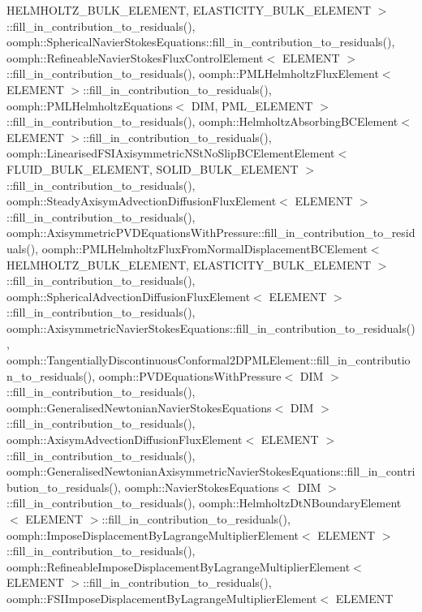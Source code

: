 H\+E\+L\+M\+H\+O\+L\+T\+Z\+\_\+\+B\+U\+L\+K\+\_\+\+E\+L\+E\+M\+E\+N\+T, E\+L\+A\+S\+T\+I\+C\+I\+T\+Y\+\_\+\+B\+U\+L\+K\+\_\+\+E\+L\+E\+M\+E\+N\+T $>$\+::fill\+\_\+in\+\_\+contribution\+\_\+to\+\_\+residuals(), oomph\+::\+Spherical\+Navier\+Stokes\+Equations\+::fill\+\_\+in\+\_\+contribution\+\_\+to\+\_\+residuals(), oomph\+::\+Refineable\+Navier\+Stokes\+Flux\+Control\+Element$<$ E\+L\+E\+M\+E\+N\+T $>$\+::fill\+\_\+in\+\_\+contribution\+\_\+to\+\_\+residuals(), oomph\+::\+P\+M\+L\+Helmholtz\+Flux\+Element$<$ E\+L\+E\+M\+E\+N\+T $>$\+::fill\+\_\+in\+\_\+contribution\+\_\+to\+\_\+residuals(), oomph\+::\+P\+M\+L\+Helmholtz\+Equations$<$ D\+I\+M, P\+M\+L\+\_\+\+E\+L\+E\+M\+E\+N\+T $>$\+::fill\+\_\+in\+\_\+contribution\+\_\+to\+\_\+residuals(), oomph\+::\+Helmholtz\+Absorbing\+B\+C\+Element$<$ E\+L\+E\+M\+E\+N\+T $>$\+::fill\+\_\+in\+\_\+contribution\+\_\+to\+\_\+residuals(), oomph\+::\+Linearised\+F\+S\+I\+Axisymmetric\+N\+St\+No\+Slip\+B\+C\+Element\+Element$<$ F\+L\+U\+I\+D\+\_\+\+B\+U\+L\+K\+\_\+\+E\+L\+E\+M\+E\+N\+T, S\+O\+L\+I\+D\+\_\+\+B\+U\+L\+K\+\_\+\+E\+L\+E\+M\+E\+N\+T $>$\+::fill\+\_\+in\+\_\+contribution\+\_\+to\+\_\+residuals(), oomph\+::\+Steady\+Axisym\+Advection\+Diffusion\+Flux\+Element$<$ E\+L\+E\+M\+E\+N\+T $>$\+::fill\+\_\+in\+\_\+contribution\+\_\+to\+\_\+residuals(), oomph\+::\+Axisymmetric\+P\+V\+D\+Equations\+With\+Pressure\+::fill\+\_\+in\+\_\+contribution\+\_\+to\+\_\+residuals(), oomph\+::\+P\+M\+L\+Helmholtz\+Flux\+From\+Normal\+Displacement\+B\+C\+Element$<$ H\+E\+L\+M\+H\+O\+L\+T\+Z\+\_\+\+B\+U\+L\+K\+\_\+\+E\+L\+E\+M\+E\+N\+T, E\+L\+A\+S\+T\+I\+C\+I\+T\+Y\+\_\+\+B\+U\+L\+K\+\_\+\+E\+L\+E\+M\+E\+N\+T $>$\+::fill\+\_\+in\+\_\+contribution\+\_\+to\+\_\+residuals(), oomph\+::\+Spherical\+Advection\+Diffusion\+Flux\+Element$<$ E\+L\+E\+M\+E\+N\+T $>$\+::fill\+\_\+in\+\_\+contribution\+\_\+to\+\_\+residuals(), oomph\+::\+Axisymmetric\+Navier\+Stokes\+Equations\+::fill\+\_\+in\+\_\+contribution\+\_\+to\+\_\+residuals(), oomph\+::\+Tangentially\+Discontinuous\+Conformal2\+D\+P\+M\+L\+Element\+::fill\+\_\+in\+\_\+contribution\+\_\+to\+\_\+residuals(), oomph\+::\+P\+V\+D\+Equations\+With\+Pressure$<$ D\+I\+M $>$\+::fill\+\_\+in\+\_\+contribution\+\_\+to\+\_\+residuals(), oomph\+::\+Generalised\+Newtonian\+Navier\+Stokes\+Equations$<$ D\+I\+M $>$\+::fill\+\_\+in\+\_\+contribution\+\_\+to\+\_\+residuals(), oomph\+::\+Axisym\+Advection\+Diffusion\+Flux\+Element$<$ E\+L\+E\+M\+E\+N\+T $>$\+::fill\+\_\+in\+\_\+contribution\+\_\+to\+\_\+residuals(), oomph\+::\+Generalised\+Newtonian\+Axisymmetric\+Navier\+Stokes\+Equations\+::fill\+\_\+in\+\_\+contribution\+\_\+to\+\_\+residuals(), oomph\+::\+Navier\+Stokes\+Equations$<$ D\+I\+M $>$\+::fill\+\_\+in\+\_\+contribution\+\_\+to\+\_\+residuals(), oomph\+::\+Helmholtz\+Dt\+N\+Boundary\+Element$<$ E\+L\+E\+M\+E\+N\+T $>$\+::fill\+\_\+in\+\_\+contribution\+\_\+to\+\_\+residuals(), oomph\+::\+Impose\+Displacement\+By\+Lagrange\+Multiplier\+Element$<$ E\+L\+E\+M\+E\+N\+T $>$\+::fill\+\_\+in\+\_\+contribution\+\_\+to\+\_\+residuals(), oomph\+::\+Refineable\+Impose\+Displacement\+By\+Lagrange\+Multiplier\+Element$<$ E\+L\+E\+M\+E\+N\+T $>$\+::fill\+\_\+in\+\_\+contribution\+\_\+to\+\_\+residuals(), oomph\+::\+F\+S\+I\+Impose\+Displacement\+By\+Lagrange\+Multiplier\+Element$<$ E\+L\+E\+M\+E\+N\+T 